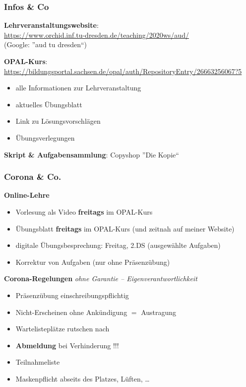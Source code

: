\documentclass{beamer}
\begin{document}
	\begin{frame}\frametitle{Infos \& Co}
		\textbf{Lehrveranstaltungswebsite}: \\
		{\small \url{https://www.orchid.inf.tu-dresden.de/teaching/2020ws/aud/} \\
			(Google: ''aud tu dresden``)}
		
		\textbf{OPAL-Kurs}: \\
		{\small \url{https://bildungsportal.sachsen.de/opal/auth/RepositoryEntry/26663256067?5}}
		
		\begin{itemize}
			\item alle Informationen zur Lehrveranstaltung
			\item aktuelles Übungsblatt
			\item Link zu Lösungsvorschlägen
			\item Übungsverlegungen
		\end{itemize}
		
		\textbf{Skript \& Aufgabensammlung}: Copyshop ''Die Kopie``
	\end{frame}

	\begin{frame} \frametitle{Corona \& Co.}
		\textbf{Online-Lehre}
		\begin{itemize}
			\item Vorlesung als Video \textbf{freitags} im OPAL-Kurs
			\item Übungsblatt \textbf{freitags} im OPAL-Kurs (und zeitnah auf meiner Website)
			\item digitale Übungsbesprechung: Freitag, 2.DS (ausgewählte Aufgaben)
			\item Korrektur von Aufgaben (nur ohne Präsenzübung)
		\end{itemize}
	
		\textbf{Corona-Regelungen} {\tiny \itshape ohne Garantie -- Eigenverantwortlichkeit}
		\begin{itemize}
			\item Präsenzübung einschreibungspflichtig
			\item Nicht-Erscheinen ohne Ankündigung $=$ Austragung
			\item Wartelisteplätze rutschen nach
			\item \textbf{Abmeldung} bei Verhinderung !!!
			\item Teilnahmeliste
			\item Maskenpflicht abseits des Platzes, Lüften, \dots
		\end{itemize}
	
		
	\end{frame}
\end{document}
